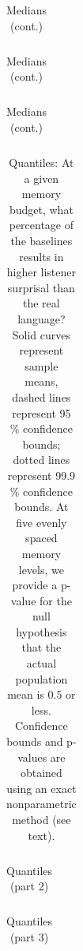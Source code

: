 \documentclass[11pt,letterpaper]{article}
\begin{document}
\begin{table}
\begin{tabular}{ccccccccccccccclll}

\end{tabular}
	\caption{Medians (cont.)}
\end{table}

\begin{table}
\begin{tabular}{ccccccccccccccclll}

\end{tabular}
	\caption{Medians (cont.)}
\end{table}

\begin{table}
\begin{tabular}{ccccccccccccccclll}

\end{tabular}
	\caption{Medians (cont.)}
\end{table}


\begin{table}
\begin{tabular}{cccccccccccccccccc}

\end{tabular}
	\caption{Quantiles: At a given memory budget, what percentage of the baselines results in higher listener surprisal than the real language? Solid curves represent sample means, dashed lines represent 95 \% confidence bounds; dotted lines represent 99.9 \% confidence bounds. At five evenly spaced memory levels, we provide a p-value for the null hypothesis that the actual population mean is $0.5$ or less. Confidence bounds and p-values are obtained using an exact nonparametric method (see text).}\label{tab:quantiles}
\end{table}

\begin{table}
\begin{tabular}{cccccccccccccccccc}

\end{tabular}
	\caption{Quantiles (part 2)}
\end{table}

\begin{table}
\begin{tabular}{cccccccccccccccccc}

\end{tabular}
	\caption{Quantiles (part 3)}
\end{table}
\end{document}
